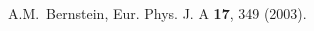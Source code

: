 \begin{thebibliography}{99}



 A.M.~Bernstein, Eur. Phys. J. A {\bf 17}, 349 (2003).

\end{thebibliography}

